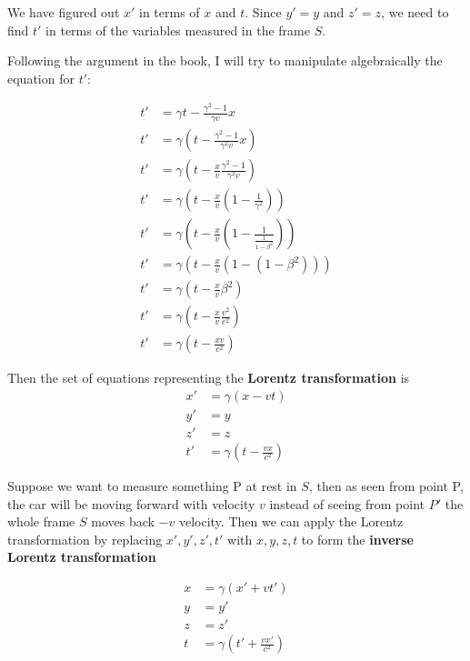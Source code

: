 We have figured out $x'$ in terms of $x$ and $t$. Since $y' = y$ and $z' = z$, we need to find $t'$ in terms of the variables measured in the frame $S$. 

Following the argument in the book, I will try to manipulate algebraically the equation for $t'$:

\begin{align*}
    t' &= \gamma t - \frac{\gamma^2 - 1}{\gamma v}x \\
    t' &= \gamma (t - \frac{\gamma^2 - 1}{\gamma^2 v}x ) \\
    t' &= \gamma (t - \frac{x}{v} \frac{\gamma ^ 2 -1}{\gamma^2 v}) \\
    t' &= \gamma (t - \frac{x}{v} (1 - \frac{1}{\gamma^2} )) \\
    t' &= \gamma (t - \frac{x}{v} (1 - \frac{1}{\frac{1}{1-\beta^2}} )) \\
    t' &= \gamma (t - \frac{x}{v} (1 - (1-\beta^2) )) \\
    t' &= \gamma (t - \frac{x}{v} \beta^2) \\ 
    t' &= \gamma (t - \frac{x}{v} \frac{v^2}{c^2} )\\
    t' &= \gamma (t - \frac{xv}{c^2})
\end{align*}

Then the set of equations representing the \textbf{Lorentz transformation} is
\begin{align*}
    x' &= \gamma (x - vt) \\
    y' &= y \\
    z' &= z \\
    t' &= \gamma (t - \frac{vx}{c^2})
\end{align*}

Suppose we want to measure something P at rest in $S$, then as seen from point P, the car will be moving forward with velocity $v$ instead of seeing from point $P'$ the whole frame $S$ moves back $-v$ velocity. Then we can apply the Lorentz transformation by replacing $x', y', z', t'$ with $x, y, z, t$ to form  the \textbf{inverse Lorentz transformation}

\begin{align*}
    x &= \gamma (x' + vt') \\
    y &= y' \\
    z &= z' \\
    t &= \gamma (t' + \frac{vx'}{c^2})
\end{align*}

